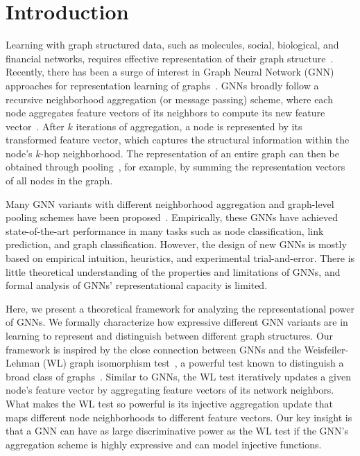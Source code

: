 
\vspace*{-5pt}

\section{Introduction}
\label{sec:intro}

Learning with graph structured data, such as molecules, social, biological,  and financial networks, requires effective representation of their graph structure~\citep{hamilton2017representation}. Recently, there has been a surge of interest in Graph Neural Network (GNN) approaches for representation learning of graphs~\citep{li2015gated,hamilton2017inductive,kipf2016semi,velivckovic2017graph, xu2018representation}. 
%
GNNs broadly follow a recursive neighborhood aggregation (or message passing) scheme, where each node aggregates feature vectors of its neighbors to compute its new feature vector~\citep{xu2018representation, gilmer2017neural}.
After $k$ iterations of aggregation, a node is represented by its transformed feature vector, which captures the structural information within the node's $k$-hop neighborhood. 
The representation of an entire graph can then be obtained through pooling~\citep{ying2018hierarchical}, for example, by summing the representation vectors of all nodes in the graph.

Many GNN variants with different neighborhood aggregation and graph-level pooling schemes have been proposed~\citep{scarselli2009graph, battaglia2016interaction,defferrard2016convolutional,duvenaud2015convolutional,hamilton2017inductive,kearnes2016molecular,kipf2016semi, li2015gated,velivckovic2017graph, santoro2017simple, xu2018representation, santoro2018measuring, verma2018graph, ying2018hierarchical,zhang2018end}. Empirically, these GNNs have achieved state-of-the-art performance in many tasks such as node classification, link prediction, and graph classification. 
%
However, the design of new GNNs is mostly based on empirical intuition, heuristics, and experimental trial-and-error.
There is little theoretical understanding of the properties and limitations of GNNs, and formal analysis of GNNs' representational capacity is limited. 

Here, we present a theoretical framework for analyzing the representational power of GNNs. We formally characterize how expressive different GNN variants are in learning to represent and distinguish between different graph structures. 
%
Our framework is inspired by the close connection between GNNs and the Weisfeiler-Lehman (WL) graph isomorphism test~\citep{weisfeiler1968reduction}, a powerful test known to distinguish a broad class of graphs~\citep{babai1979canonical}. Similar to GNNs, the WL test iteratively updates a given node's feature vector by aggregating feature vectors of its network neighbors. What makes the WL test so powerful is its injective aggregation update that maps different node neighborhoods to different feature vectors.
Our key insight is that a GNN can have as large discriminative power as the WL test if the GNN's aggregation scheme is highly expressive and can model injective functions.

